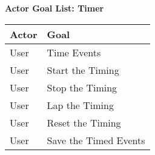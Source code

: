 \documentclass[letterpaper]{article}
\begin{document}
\noindent
\begin{center}
\textbf{Actor Goal List:  Timer}

\vspace{2ex}
\begin{tabular}{|p{3.5cm}|p{5cm}|}\hline
\textbf{Actor} & \textbf{Goal}\\\hline
User & Time Events\\\hline
User & Start the Timing\\\hline
User & Stop the Timing\\\hline
User & Lap the Timing\\\hline
User & Reset the Timing\\\hline
User & Save the Timed Events\\\hline
\end{tabular}
\end{center}
\end{document}
